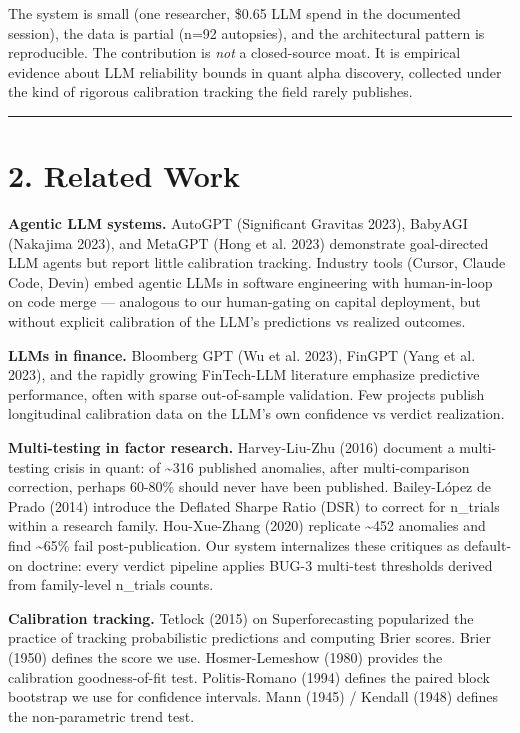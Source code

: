 \documentclass[11pt,a4paper]{article}
\begin{document}
The system is small (one researcher, \$0.65 LLM spend in the documented session), the data is partial (n=92 autopsies), and the architectural pattern is reproducible. The contribution is \textit{not} a closed-source moat. It is empirical evidence about LLM reliability bounds in quant alpha discovery, collected under the kind of rigorous calibration tracking the field rarely publishes.

\medskip\hrule\medskip

\section{2. Related Work}

\textbf{Agentic LLM systems.} AutoGPT (Significant Gravitas 2023), BabyAGI (Nakajima 2023), and MetaGPT (Hong et al. 2023) demonstrate goal-directed LLM agents but report little calibration tracking. Industry tools (Cursor, Claude Code, Devin) embed agentic LLMs in software engineering with human-in-loop on code merge — analogous to our human-gating on capital deployment, but without explicit calibration of the LLM's predictions vs realized outcomes.

\textbf{LLMs in finance.} Bloomberg GPT (Wu et al. 2023), FinGPT (Yang et al. 2023), and the rapidly growing FinTech-LLM literature emphasize predictive performance, often with sparse out-of-sample validation. Few projects publish longitudinal calibration data on the LLM's own confidence vs verdict realization.

\textbf{Multi-testing in factor research.} Harvey-Liu-Zhu (2016) document a multi-testing crisis in quant: of \textasciitilde{}316 published anomalies, after multi-comparison correction, perhaps 60-80\% should never have been published. Bailey-López de Prado (2014) introduce the Deflated Sharpe Ratio (DSR) to correct for n\_trials within a research family. Hou-Xue-Zhang (2020) replicate \textasciitilde{}452 anomalies and find \textasciitilde{}65\% fail post-publication. Our system internalizes these critiques as default-on doctrine: every verdict pipeline applies BUG-3 multi-test thresholds derived from family-level n\_trials counts.

\textbf{Calibration tracking.} Tetlock (2015) on Superforecasting popularized the practice of tracking probabilistic predictions and computing Brier scores. Brier (1950) defines the score we use. Hosmer-Lemeshow (1980) provides the calibration goodness-of-fit test. Politis-Romano (1994) defines the paired block bootstrap we use for confidence intervals. Mann (1945) / Kendall (1948) defines the non-parametric trend test.
\end{document}
